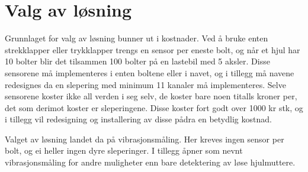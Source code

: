 \section{Valg av løsning}
Grunnlaget for valg av løsning bunner ut i kostnader. Ved å bruke enten strekklapper eller
trykklapper trengs en sensor per eneste bolt, og når et hjul har 10 bolter blir det tilsammen
100 bolter på en lastebil med 5 aksler. Disse sensorene må implementeres i enten boltene 
eller i navet, og i tillegg må navene redesignes da en slepering med minimum 11 kanaler 
må implementeres. Selve sensorene koster ikke all verden i seg selv, de koster bare noen 
titalls kroner per, det som derimot koster er sleperingene. Disse koster fort godt over 
1000 kr stk, og i tillegg vil redesigning og installering av disse pådra en betydlig kostnad.

Valget av løsning landet da på vibrasjonsmåling. Her kreves ingen sensor per bolt, og 
ei heller ingen dyre sleperinger. I tillegg åpner som nevnt vibrasjonsmåling for andre 
muligheter enn bare detektering av løse hjulmuttere. 